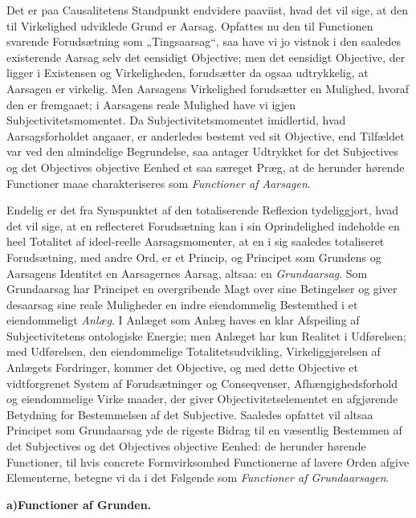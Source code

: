 \documentclass[12pt]{book}
\newcommand{\opage}[1]{\marginnote{\footnotesize\textit{[#1]}}}
\begin{document}
Det er paa Causalitetens Standpunkt endvidere paaviist, hvad det vil sige, at den til Virkelighed
udviklede Grund er Aarsag. Opfattes nu den til Functionen svarende Forudsætning som „Tingsaarsag“, saa
have vi jo vistnok i den saaledes existerende Aarsag selv det eensidigt Objective; men det eensidigt
Objective, der ligger i Existensen og Virkeligheden, forudsætter da ogsaa udtrykkelig, at Aarsagen er
virkelig. Men Aarsagens Virkelighed forudsætter en Mulighed, hvoraf den er fremgaaet; i Aarsagens reale
Mulighed have vi igjen Subjectivitetsmomentet. Da Subjectivitetsmomentet imidlertid, hvad
Aarsagsforholdet angaaer, er anderledes bestemt ved sit Objective, end Tilfældet var ved den almindelige
Begrundelse, saa antager Udtrykket for det Subjectives og det Objectives objective Eenhed et saa
særeget Præg, at de herunder hørende Functioner maae charakteriseres som \emph{Functioner af Aarsagen}.

Endelig er det fra Synspunktet af den totaliserende Reflexion tydeliggjort, hvad det vil sige, at en
reflecteret Forudsætning kan i sin Oprindelighed indeholde en heel Totalitet af ideel-reelle
Aarsagsmomenter, at en i sig saaledes totaliseret Forudsætning, med andre Ord, er et Princip, og
Principet som Grundens og Aarsagens Identitet en Aarsagernes Aarsag, altsaa: en \emph{Grundaarsag}. Som
Grundaarsag har Principet en overgribende Magt over sine Betingelser og giver desaarsag sine reale
Muligheder en indre eiendommelig Bestemthed i et eiendommeligt \emph{Anlæg}. I Anlæget som Anlæg haves
en klar Afspeiling af Subjectivitetens ontologiske Energie; men Anlæget har kun Realitet i Udførelsen;
med Udførelsen, den eiendommelige Totalitetsudvikling, Virkeliggjørelsen af Anlægets Fordringer, kommer
det Objective, og med dette Objective et vidtforgrenet System af Forudsætninger og Conseqvenser,
Afhængighedsforhold og eiendommelige Virke%
\opage{286} maader, der giver Objectivitetselementet en afgjørende Betydning for Bestemmelsen af det Subjective.
Saaledes opfattet vil altsaa Principet som Grundaarsag yde de rigeste Bidrag til en væsentlig Bestemmen
af det Subjectives og det Objectives objective Eenhed: de herunder hørende Functioner, til hvis concrete
Formvirksomhed Functionerne af lavere Orden afgive Elementerne, betegne vi da i det Følgende som
\emph{Functioner af Grundaarsagen}.

\begin{center}
{\bfseries a)\quad Functioner af Grunden.}
\end{center}
\end{document}
